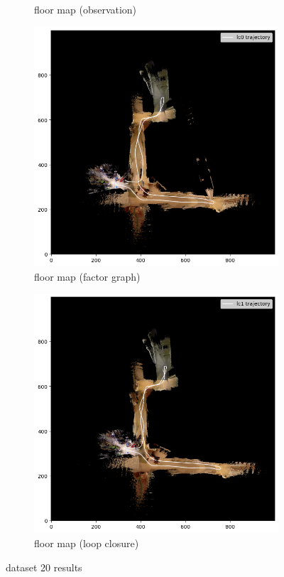 \documentclass[conference]{IEEEtran}
\begin{document}
\begin{figure}
\begin{subfigure}{0.24\textwidth}
        \caption{floor map (observation)}
        \label{fig:fmap_20_icp}
    \end{subfigure}
    \hfill
    \begin{subfigure}{0.24\textwidth}
        \includegraphics[width=\linewidth]{../img/fmap_20_lc0.png}
        \caption{floor map (factor graph)}
        \label{fig:fmap_20_lc0}
    \end{subfigure}
    \hfill
    \begin{subfigure}{0.24\textwidth}
        \includegraphics[width=\linewidth]{../img/fmap_20_lc1.png}
        \caption{floor map (loop closure)}
        \label{fig:fmap_20_lc1}
    \end{subfigure}
    
    \caption{dataset 20 results}
    \label{fig:dataset20}
\end{figure}
\end{document}
